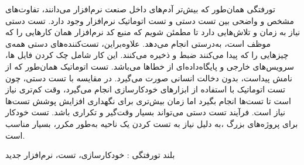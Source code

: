 


\pagestyle{empty}

‌تورفتگی
همان‌طور که بیش‌تر آدم‌های داخل صنعت نرم‌افزار می‌دانند، تفاوت‌های مشخص و واضحی بین تست دستی و تست اتوماتیک نرم‌افزار وجود دارد. تست دستی نیاز به زمان و تلاش‌هایی دارد تا مطمئن شویم که منبع کد نرم‌افزار همان کارهایی را که موظف است، به‌درستی انجام می‌دهد. علاوه‌براین، تست‌کننده‌های دستی همه‌ی چیزهایی را که پیدا می‌کنند ضبط و ذخیره می‌کنند. این کار شامل چک کردن فایل ها، سرویس‌های خارجی و پایگاه‌داده‌ای از خطاها می‌باشد. 
تست اتوماتیک همان‌طور که از نامش پیداست، بدون دخالت انسانی صورت می‌گیرد. در مقایسه با تست دستی، چون تست اتوماتیک با استفاده از ابزار‌های خودکارسازی انجام می‌گیرد، وقت کم‌تری نیاز است تا تست‌ها انجام بگیرد اما زمان بیش‌تری برای نگهداری افزایش پوشش تست‌ها نیاز است. فرآیند تست دستی می‌تواند بسیار وقت‌گیر و تکراری باشد. تست خودکار برای پروژه‌های بزرگ ،به دلیل نیاز به تست کردن یک ناحیه به‌طور مکرر، بسیار مناسب است.

‌بلند
‌تورفتگی : 
خودکارسازی، تست، نرم‌افزار
‌جدید

